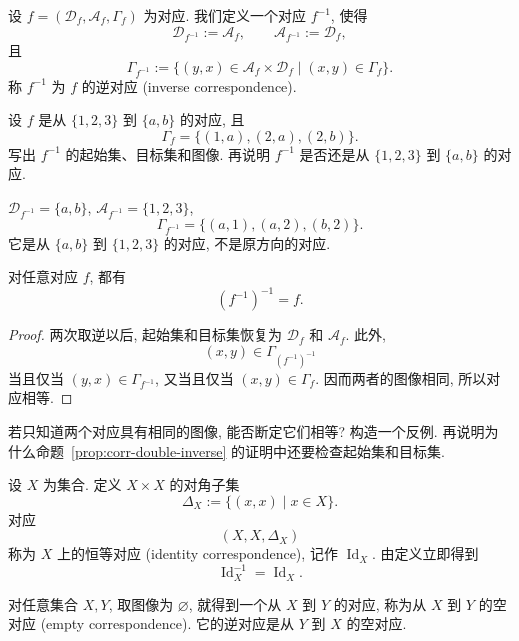 \documentclass[usesamecnt, thmcnt=section, lang=cn, newtx, 10pt, scheme=chinese]{elegantbook}
\begin{document}
\begin{definition}[逆对应]\label{def:corr-inverse}
设 $f=(\mathscr D_f,\mathscr A_f,\Gamma_f)$ 为对应. 我们定义一个对应 $f^{-1}$, 使得
\[
 \mathscr D_{f^{-1}}:=\mathscr A_f,
 \qquad
 \mathscr A_{f^{-1}}:=\mathscr D_f,
\]
且
\[
 \Gamma_{f^{-1}}
 :=\{(y,x)\in\mathscr A_f\times\mathscr D_f\mid (x,y)\in\Gamma_f\}.
\]
称 $f^{-1}$ 为 $f$ 的{\color{blue}逆对应 (inverse correspondence)}.
\end{definition}

\begin{concept}\label{con:corr-02}
设 $f$ 是从 $\{1,2,3\}$ 到 $\{a,b\}$ 的对应, 且
\[
 \Gamma_f=\{(1,a),(2,a),(2,b)\}.
\]
写出 $f^{-1}$ 的起始集、目标集和图像. 再说明 $f^{-1}$ 是否还是从 $\{1,2,3\}$ 到 $\{a,b\}$ 的对应.
\end{concept}

\begin{solution}
$\mathscr D_{f^{-1}}=\{a,b\}$, $\mathscr A_{f^{-1}}=\{1,2,3\}$,
\[
 \Gamma_{f^{-1}}=\{(a,1),(a,2),(b,2)\}.
\]
它是从 $\{a,b\}$ 到 $\{1,2,3\}$ 的对应, 不是原方向的对应.
\end{solution}

\begin{proposition}\label{prop:corr-double-inverse}
对任意对应 $f$, 都有
\[
 (f^{-1})^{-1}=f.
\]
\end{proposition}

\begin{proof}
两次取逆以后, 起始集和目标集恢复为 $\mathscr D_f$ 和 $\mathscr A_f$. 此外,
\[
 (x,y)\in\Gamma_{(f^{-1})^{-1}}
\]
当且仅当 $(y,x)\in\Gamma_{f^{-1}}$, 又当且仅当 $(x,y)\in\Gamma_f$. 因而两者的图像相同, 所以对应相等.
\end{proof}

\begin{exercise}\label{ex:corr-double-inverse}
若只知道两个对应具有相同的图像, 能否断定它们相等? 构造一个反例. 再说明为什么命题~\ref{prop:corr-double-inverse} 的证明中还要检查起始集和目标集.
\end{exercise}

\begin{instance}
设 $X$ 为集合. 定义 $X\times X$ 的对角子集
\[
 \Delta_X:=\{(x,x) \mid x\in X\}.
\]
对应
\[
 (X,X,\Delta_X)
\]
称为 $X$ 上的{\color{blue}恒等对应 (identity correspondence)}, 记作 $\operatorname{Id}_X$. 由定义立即得到
\[
 \operatorname{Id}_X^{-1}=\operatorname{Id}_X.
\]
\end{instance}

\begin{instance}
对任意集合 $X,Y$, 取图像为 $\varnothing$, 就得到一个从 $X$ 到 $Y$ 的对应, 称为从 $X$ 到 $Y$ 的{\color{blue}空对应 (empty correspondence)}. 它的逆对应是从 $Y$ 到 $X$ 的空对应.
\end{instance}
\end{document}
